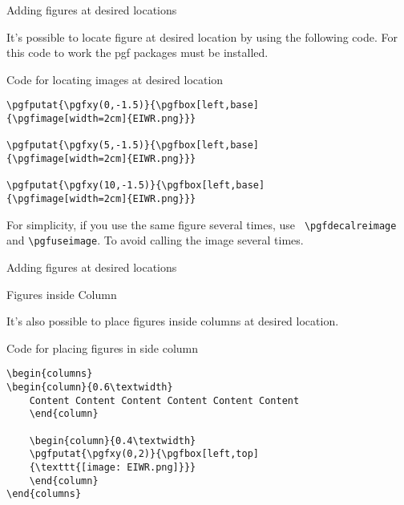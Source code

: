 \documentclass[10pt,xcolor=x11names]{beamer}
\begin{document}
\begin{frame}[fragile]{Adding figures at desired locations } 

It's possible to locate figure at desired location by using the following code. For this code to work the pgf packages must be installed.

{\footnotesize 
\begin{exampleblock}{Code for locating images at desired location}
\begin{verbatim}
\pgfputat{\pgfxy(0,-1.5)}{\pgfbox[left,base]
{\pgfimage[width=2cm]{EIWR.png}}}

\pgfputat{\pgfxy(5,-1.5)}{\pgfbox[left,base]
{\pgfimage[width=2cm]{EIWR.png}}}

\pgfputat{\pgfxy(10,-1.5)}{\pgfbox[left,base]
{\pgfimage[width=2cm]{EIWR.png}}}	
\end{verbatim}
\end{exampleblock}}

For simplicity, if you use the same figure several times, use \verb| \pgfdecalreimage|  and \verb|\pgfuseimage|. 
To avoid calling the image several times.

\end{frame}

\begin{frame}{Adding figures at desired locations }




\end{frame}


\begin{frame}[fragile]{Figures inside Column}

It's also possible to place figures inside columns at desired location. 

\begin{exampleblock}{Code for placing figures in side column}
	
\begin{verbatim}
\begin{columns}
\begin{column}{0.6\textwidth}
	Content Content Content Content Content Content 
	\end{column}
	
	\begin{column}{0.4\textwidth}
	\pgfputat{\pgfxy(0,2)}{\pgfbox[left,top]
	{\texttt{[image: EIWR.png]}}}
	\end{column}	
\end{columns}	
\end{verbatim}
	
\end{exampleblock}
\end{frame}
\end{document}
